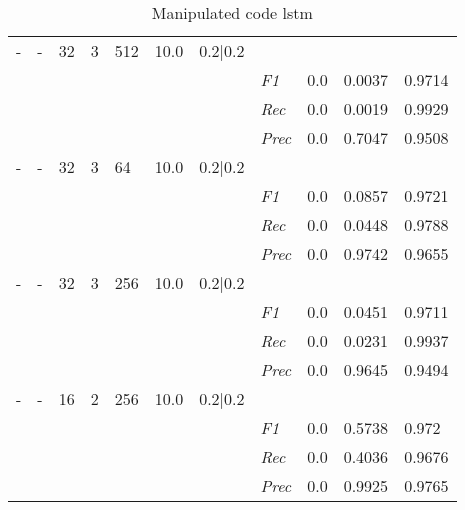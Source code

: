 \begin{table}[]
\begin{tabularx}{\textwidth}{XXXXXXX|X|X|X|X}
- & - & 32 & 3 & 512 &10.0 & 0.2|0.2 & & & & \\
& & & & & & & \textit{F1} & 0.0 & 0.0037 & 0.9714       \\
& & & & & & & \textit{Rec} &  0.0 & 0.0019  & 0.9929  \\
& & & & & & & \textit{Prec} & 0.0 & 0.7047 & 0.9508 \\ \midrule
- & - & 32 & 3 & 64 &10.0 & 0.2|0.2 & & & & \\
& & & & & & & \textit{F1} & 0.0 & 0.0857 & 0.9721       \\
& & & & & & & \textit{Rec} &  0.0 & 0.0448  & 0.9788  \\
& & & & & & & \textit{Prec} & 0.0 & 0.9742 & 0.9655 \\ \midrule
- & - & 32 & 3 & 256 &10.0 & 0.2|0.2 & & & & \\
& & & & & & & \textit{F1} & 0.0 & 0.0451 & 0.9711       \\
& & & & & & & \textit{Rec} &  0.0 & 0.0231  & 0.9937  \\
& & & & & & & \textit{Prec} & 0.0 & 0.9645 & 0.9494 \\ \midrule
- & - & 16 & 2 & 256 &10.0 & 0.2|0.2 & & & & \\
& & & & & & & \textit{F1} & 0.0 & 0.5738 & 0.972       \\
& & & & & & & \textit{Rec} &  0.0 & 0.4036  & 0.9676  \\
& & & & & & & \textit{Prec} & 0.0 & 0.9925 & 0.9765 \\ \midrule
\end{tabularx}
\caption{Manipulated code lstm}
\label{tab:rq3_lstm}
\end{table}